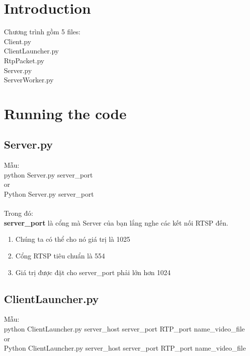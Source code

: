 \documentclass[a4paper]{article}
\begin{document}
\newpage
\tableofcontents
\newpage


\section{Introduction}

Chương trình gồm 5 files: \\
\indent Client.py \\
\indent ClientLauncher.py \\
\indent RtpPacket.py \\
\indent Server.py \\
\indent ServerWorker.py \\

\section{Running the code}

\subsection{Server.py}

Mẫu: \\
\indent python Server.py server\_port \\
\indent or \\
\indent Python Server.py server\_port \\
\\

\noindent Trong đó: \\
\indent \textbf{server\_port} là cổng mà Server của bạn lắng nghe các kết nối RTSP đến.
\begin{enumerate}
    \item Chúng ta có thể cho nó giá trị là 1025
    \item Cổng RTSP tiêu chuẩn là 554
    \item Giá trị được đặt cho server\_port phải lớn hơn 1024
\end{enumerate}

\subsection{ClientLauncher.py}

Mẫu: \\
\indent python ClientLauncher.py server\_host server\_port RTP\_port name\_video\_file \\
\indent or \\
\indent Python ClientLauncher.py server\_host server\_port RTP\_port name\_video\_file \\
\\
\end{document}

